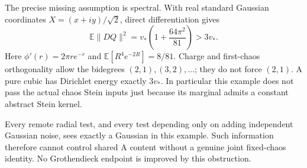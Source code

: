 The precise missing assumption is spectral. With real standard Gaussian coordinates $X=(x+iy)/\sqrt2$, direct differentiation gives
\[
\mathbb E\|DQ\|^2
 =v_*\left(1+\frac{64\pi^2}{81}\right)>3v_*.
\]
Here $\phi'(r)=2\pi r e^{-r}$ and $\mathbb E[R^4e^{-2R}]=8/81$. Charge and first-chaos orthogonality allow the bidegrees $(2,1),(3,2),\ldots$; they do not force $(2,1)$. A pure cubic has Dirichlet energy exactly $3v_*$. In particular this example does not pass the actual chaos Stein inputs just because its marginal admits a constant abstract Stein kernel.

Every remote radial test, and every test depending only on adding independent Gaussian noise, sees exactly a Gaussian in this example. Such information therefore cannot control shared A content without a genuine joint fixed-chaos identity. No Grothendieck endpoint is improved by this obstruction.
